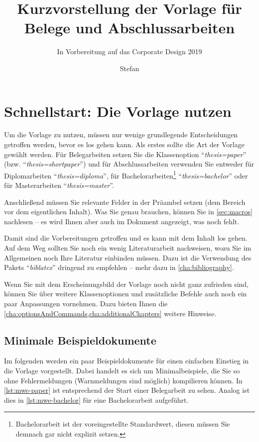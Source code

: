 \documentclass[
%
	thesis=paper,		%
	compactlistof,		%
	noauthorship,		%
%
	fancy,				%
%
%
]{hsmw-thesis}
\title{Kurzvorstellung der Vorlage für Belege und Abschlussarbeiten}%
\author{Stefan}{Schildbach}[M.Sc.]%
\subtitle{In Vorbereitung auf das Corporate Design 2019}%
\begin{document}
	\chapter{Schnellstart: Die Vorlage nutzen}
	
	Um die Vorlage zu nutzen, müssen nur wenige grundlegende Entscheidungen getroffen werden, bevor es los gehen kann.
	Als erstes sollte die Art der Vorlage gewählt werden.
	Für Belegarbeiten setzen Sie die Klassenoption \enquote{\textit{thesis=paper}} (bzw. \enquote{\textit{thesis=shortpaper}}) und für Abschlussarbeiten verwenden Sie entweder für Diplomarbeiten \enquote{\textit{thesis=diploma}}, für Bachelorarbeiten\footnote{Bachelorarbeit ist der voreingestellte Standardwert, diesen müssen Sie demnach gar nicht explizit setzen.} \enquote{\textit{thesis=bachelor}} oder für Masterarbeiten \enquote{\textit{thesis=master}}.
	
	Anschließend müssen Sie relevante Felder in der Präambel setzen (dem Bereich vor dem eigentlichen Inhalt).
	Was Sie genau brauchen, können Sie in \cref{sec:macros} nachlesen -- es wird Ihnen aber auch im Dokument angezeigt, was noch fehlt.
	
	Damit sind die Vorbereitungen getroffen und es kann mit dem Inhalt los gehen.
	Auf dem Weg sollten Sie noch ein wenig Literaturarbeit nachweisen, wozu Sie im Allgemeinen noch Ihre Literatur einbinden müssen.
	Dazu ist die Verwendung des Pakets \enquote{\textit{biblatex}} dringend zu empfehlen -- mehr dazu in \cref{cha:bibliography}.
	
	Wenn Sie mit dem Erscheinungsbild der Vorlage noch nicht ganz zufrieden sind, können Sie über weitere Klassenoptionen und zusätzliche Befehle auch noch ein paar Anpassungen vornehmen.
	Dazu bieten Ihnen die \cref{cha:optionsAndCommands,cha:additionalChapters} weitere Hinweise.
	
	\section{Minimale Beispieldokumente}
	
	Im folgenden werden ein paar Beispieldokumente für einen einfachen Einstieg in die Vorlage vorgestellt.
	Dabei handelt es sich um Minimalbeispiele, die Sie so ohne Fehlermeldungen (Warnmeldungen sind möglich) kompilieren können.
	In \cref{lst:mwe-paper} ist entsprechend der Start einer Belegarbeit zu sehen.
	Analog ist dies in \cref{lst:mwe-bachelor} für eine Bachelorarbeit aufgeführt.
	
	
	
\end{document}
